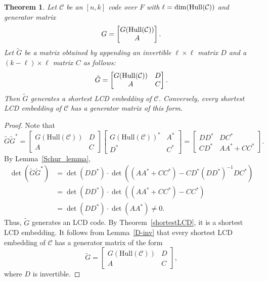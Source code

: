 \documentclass{article}
\newtheorem{theorem}{Theorem}[section]
\theoremstyle{definition}
\theoremstyle{remark}
\begin{document}
\begin{theorem}\label{construct-LCD}
    Let $\mathcal{C}$ be an $[n, k]$ code over $F$ with $\ell=\dim({\rm Hull}(\mathcal{C}))$ and generator matrix
    \[
    G=\begin{bmatrix}
    G({\rm Hull}(\mathcal{C}))\\A
    \end{bmatrix}.
    \]
    Let $\tilde{G}$ be a matrix obtained by appending an invertible $\ell\times \ell$ matrix $D$ and a $(k-\ell)\times \ell$ matrix $C$ as follows:
    \[
    \tilde{G}=\begin{bmatrix}
        G({\rm Hull}(\mathcal{C})) & D\\A & C
    \end{bmatrix}.
    \]
    Then $\tilde{G}$ generates a shortest LCD embedding of $\mathcal{C}$. Conversely, every shortest LCD embedding of $\mathcal{C}$ has a generator matrix of this form.
\end{theorem}
\begin{proof}
    Note that
    \[
    \tilde{G}\tilde{G}^*=\begin{bmatrix}
        G(\text{Hull}(\mathcal{C})) & D\\A & C
    \end{bmatrix}\begin{bmatrix}
        G(\text{Hull}(\mathcal{C}))^* & A^*\\D^* & C^*
    \end{bmatrix}=\begin{bmatrix}
        DD^* & DC^*\\CD^* & AA^*+CC^*
    \end{bmatrix}.
    \]
    By Lemma~\ref{Schur_lemma},
    \begin{align*}
    \det(\tilde{G}\tilde{G}^*)&=\det(DD^*)\cdot\det((AA^*+CC^*)-CD^*(DD^*)^{-1}DC^*)\\&=\det(DD^*)\cdot\det((AA^*+CC^*)-CC^*)\\&=\det(DD^*)\cdot\det(AA^*)\ne 0.
    \end{align*}
    Thus, $\tilde{G}$ generates an LCD code. By Theorem~\ref{shortestLCD}, it is a shortest LCD embedding. It follows from Lemma~\ref{D-inv} that every shortest LCD embedding of $\mathcal{C}$ has a generator matrix of the form
    \[
    \tilde{G}=\begin{bmatrix}
        G(\text{Hull}(\mathcal{C})) & D\\A & C
    \end{bmatrix},
    \]
    where $D$ is invertible.
\end{proof}
\end{document}
